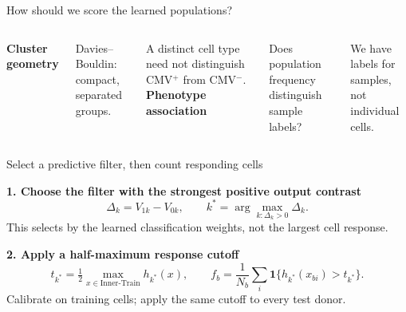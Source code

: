 \begin{frame}{How should we score the learned populations?}

\begin{columns}[T,onlytextwidth]
\textbf{Cluster geometry}\par
\vspace{2mm}
Davies--Bouldin: compact, separated groups.\par
\vspace{3mm}
A distinct cell type need not distinguish CMV$^+$ from CMV$^-$. 
\textbf{Phenotype association}\par
\vspace{2mm}
Does population frequency distinguish sample labels?\par
\vspace{3mm}
We have labels for samples, not individual cells.
\end{columns}
\vspace{4mm}

\end{frame}

\begin{frame}{Select a predictive filter, then count responding cells}

\textbf{1. Choose the filter with the strongest positive output contrast}
\[\Delta_k=V_{1k}-V_{0k},\qquad k^*=\arg\max_{k:\Delta_k>0}\Delta_k.\]
\small This selects by the learned classification weights, not the largest cell response.
\vspace{2mm}\par
\normalsize\textbf{2. Apply a half-maximum response cutoff}
\[t_{k^*}=\tfrac12\max_{x\in\mathrm{Inner\text{-}Train}}h_{k^*}(x),\qquad
f_b=\frac1{N_b}\sum_i\mathbf1\{h_{k^*}(x_{bi})>t_{k^*}\}.\]
\small Calibrate on training cells; apply the same cutoff to every test donor.

\end{frame}


